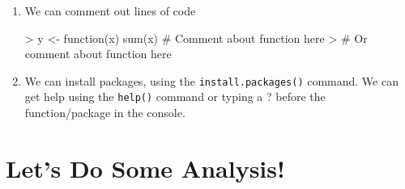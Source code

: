 \documentclass[12pt]{article}
\begin{document}
\begin{enumerate}
\item We can comment out lines of code
\begin{Schunk}
\begin{Sinput}
> y <- function(x) sum(x)      # Comment about function here
> # Or comment about function here
\end{Sinput}
\end{Schunk}

\item We can install packages, using the {\tt install.packages()} command.
\itme We can get help using the {\tt help()} command or typing a ? before the function/package in the console.

\end{enumerate}

\section{Let's Do Some Analysis!}
\end{document}
